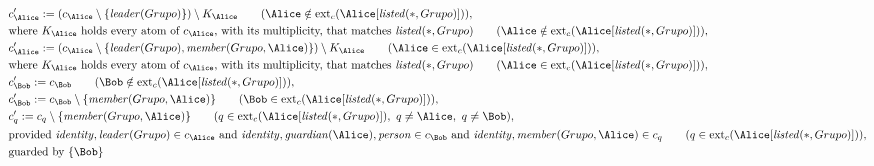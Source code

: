 \begin{align*}
&
c'_
{
\Alice
}
 := 
(c_
{
\Alice
}
 \setminus 
\{
\mathit{
leader
}
(
Grupo
)
\}
) \setminus K_
{
\Alice
}
 \qquad (
\Alice
 \notin 
\mathrm{ext}_c(
\Alice
[
\mathit{
listed
}
(
\ast
,
Grupo
)
]
)
)
,\\
&
\text{where } K_
{
\Alice
}
 \text{ holds every atom of } c_
{
\Alice
}
 \text{, with its multiplicity, that matches } 
\mathit{
listed
}
(
\ast
,
Grupo
)
 \qquad (
\Alice
 \notin 
\mathrm{ext}_c(
\Alice
[
\mathit{
listed
}
(
\ast
,
Grupo
)
]
)
)
,\\
&
c'_
{
\Alice
}
 := 
(c_
{
\Alice
}
 \setminus 
\{
\mathit{
leader
}
(
Grupo
)
,
\mathit{
member
}
(
Grupo
,
\Alice
)
\}
) \setminus K_
{
\Alice
}
 \qquad (
\Alice
 \in 
\mathrm{ext}_c(
\Alice
[
\mathit{
listed
}
(
\ast
,
Grupo
)
]
)
)
,\\
&
\text{where } K_
{
\Alice
}
 \text{ holds every atom of } c_
{
\Alice
}
 \text{, with its multiplicity, that matches } 
\mathit{
listed
}
(
\ast
,
Grupo
)
 \qquad (
\Alice
 \in 
\mathrm{ext}_c(
\Alice
[
\mathit{
listed
}
(
\ast
,
Grupo
)
]
)
)
,\\
&
c'_
{
\Bob
}
 := 
c_
{
\Bob
}
 \qquad (
\Bob
 \notin 
\mathrm{ext}_c(
\Alice
[
\mathit{
listed
}
(
\ast
,
Grupo
)
]
)
)
,\\
&
c'_
{
\Bob
}
 := 
c_
{
\Bob
}
 \setminus 
\{
\mathit{
member
}
(
Grupo
,
\Alice
)
\}
 \qquad (
\Bob
 \in 
\mathrm{ext}_c(
\Alice
[
\mathit{
listed
}
(
\ast
,
Grupo
)
]
)
)
,\\
&
c'_
q
 := 
c_
q
 \setminus 
\{
\mathit{
member
}
(
Grupo
,
\Alice
)
\}
 \qquad (
q
 \in 
\mathrm{ext}_c(
\Alice
[
\mathit{
listed
}
(
\ast
,
Grupo
)
]
)
,\ 
q \neq 
\Alice
,\ 
q \neq 
\Bob
)
,\\
&
\text{provided } 
\mathit{
identity
}
,
\mathit{
leader
}
(
Grupo
)
 \in c_
{
\Alice
}
 \text{ and } 
\mathit{
identity
}
,
\mathit{
guardian
}
(
\Alice
)
,
\mathit{
person
}
 \in c_
{
\Bob
}
 \text{ and } 
\mathit{
identity
}
,
\mathit{
member
}
(
Grupo
,
\Alice
)
 \in c_
q
 \qquad (
q \in 
\mathrm{ext}_c(
\Alice
[
\mathit{
listed
}
(
\ast
,
Grupo
)
]
)
)
,\\
&
\text{guarded by } \{
\Bob
\}
\end{align*}

